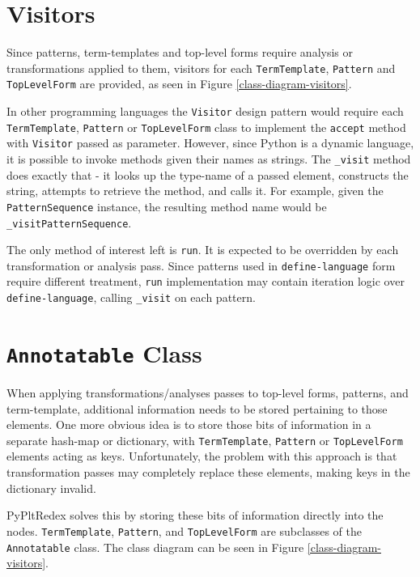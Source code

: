 \section{Visitors}
\label{section:visitors}
Since patterns, term-templates and top-level forms require analysis or transformations applied to them, visitors for each \texttt{TermTemplate}, \texttt{Pattern} and \texttt{TopLevelForm} are provided, as seen in Figure \ref{class-diagram-visitors}.

In other programming languages the \texttt{Visitor} design pattern would require each \texttt{TermTemplate}, \texttt{Pattern} or \texttt{TopLevelForm} class to implement the \texttt{accept} method with \texttt{Visitor} passed as parameter. However, since Python is a dynamic language, it is possible to invoke methods given their names as strings. The \texttt{\_visit} method does exactly that - it looks up the type-name of a passed element, constructs the string, attempts to retrieve the method, and calls it. For example, given the \texttt{PatternSequence} instance, the resulting method name would be \texttt{\_visitPatternSequence}.

The only method of interest left is \texttt{run}. It is expected to be overridden by each transformation or analysis pass.  Since patterns used in \texttt{define-language} form require different treatment, \texttt{run} implementation may contain iteration logic over \texttt{define-language}, calling \texttt{\_visit} on each pattern.

\section{\texttt{Annotatable} Class}

When applying transformations/analyses passes to top-level forms, patterns, and term-template, additional information needs to be stored pertaining to those elements. One more obvious idea is to store those bits of information in a separate hash-map or dictionary, with \texttt{TermTemplate}, \texttt{Pattern} or \texttt{TopLevelForm} elements acting as keys. Unfortunately, the problem with this approach is that transformation passes may completely replace these elements, making keys in the dictionary invalid.

PyPltRedex solves this by storing these bits of information directly into the nodes. \texttt{TermTemplate}, \texttt{Pattern}, and \texttt{TopLevelForm} are subclasses of the \texttt{Annotatable} class. The class diagram can be seen in Figure \ref{class-diagram-visitors}.

